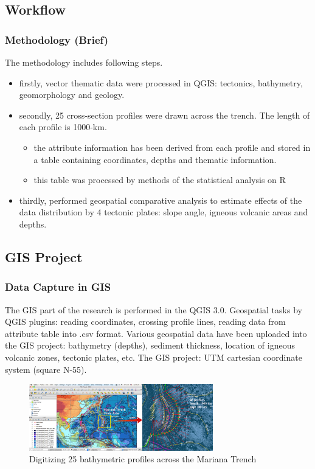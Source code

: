 \documentclass[pdflatex,compress,10pt,
	xcolor={dvipsnames,dvipsnames,svgnames,x11names,table},
	hyperref={colorlinks = true,breaklinks = true, urlcolor = NavyBlue, breaklinks = true}]{beamer}
\begin{document}
\subsection{Workflow}
\begin{frame}
\frametitle{Methodology (Brief)}
The methodology includes following steps. 
\begin{itemize}
    \item<1-> firstly, vector thematic data were processed in QGIS: tectonics, bathymetry, geomorphology and geology.
    \item<2-> secondly, 25 cross-section profiles were drawn across the trench. The length of each profile is 1000-km. 
        \begin{itemize}
            \item the attribute information has been derived from each profile and stored in a table containing coordinates, depths and thematic information.
            \item this table was processed by methods of the statistical analysis on R
        \end{itemize}
      \item<3-> thirdly, performed geospatial comparative analysis to estimate effects of the data distribution by 4 tectonic plates: slope angle, igneous volcanic areas and depths.
\end{itemize}
\end{frame}

\subsection{GIS Project}
\begin{frame}
\frametitle{Data Capture in GIS}
			
The GIS part of the research is performed in the QGIS 3.0. 
Geospatial tasks by QGIS plugins: reading coordinates, crossing profile lines, reading data from attribute table into .csv format. Various geospatial data have been uploaded into the GIS project: bathymetry (depths), sediment thickness, location of igneous volcanic zones, tectonic plates, etc. The GIS project: UTM cartesian coordinate system (square N-55). 
\begin{figure}[H]
	\centering
		\includegraphics[width=8cm]{Fig-2-1.jpg}
	\caption{Digitizing 25 bathymetric profiles across the Mariana Trench}\label{fig:2-1}
\end{figure}		
\end{frame}
\end{document}

